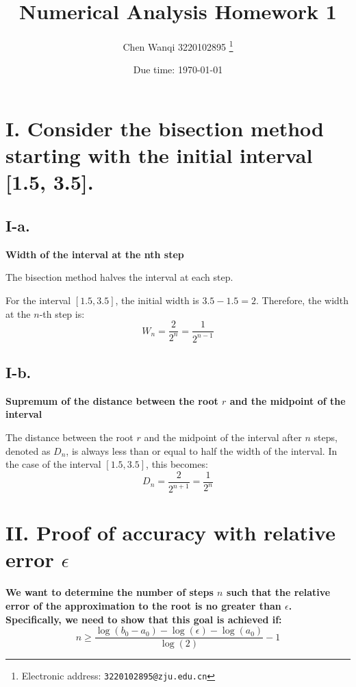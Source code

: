 \documentclass[a4paper]{article}
\begin{document}
\title{Numerical Analysis Homework 1}

\author{Chen Wanqi 3220102895
  \thanks{Electronic address: \texttt{3220102895@zju.edu.cn}}}

\date{Due time: \today}

\maketitle

\section*{I. Consider the bisection method starting with the initial interval [1.5, 3.5].}

\subsection*{I-a.}
\textbf{Width of the interval at the nth step}

The bisection method halves the interval at each step.

For the interval $[1.5, 3.5]$, the initial width is $3.5 - 1.5 = 2$. Therefore, the width at the $n$-th step is: 
\[
W_n = \frac{2}{2^n} = \frac{1}{2^{n-1}}
\]

\subsection*{I-b.}
\textbf{Supremum of the distance between the root $r$ and the midpoint of the interval}

The distance between the root $r$ and the midpoint of the interval after $n$ steps, denoted as $D_n$, is always less than or equal to half the width of the interval. In the case of the interval $[1.5, 3.5]$, this becomes:
\[
D_n = \frac{2}{2^{n+1}} = \frac{1}{2^n}
\]

\section*{II. Proof of accuracy with relative error $\epsilon$}

\textbf{We want to determine the number of steps $n$ such that the relative error of the approximation to the root is no greater than $\epsilon$. Specifically, we need to show that this goal is achieved if:}
\[
n \geq \frac{\log(b_0 - a_0) - \log(\epsilon) - \log(a_0)}{\log(2)} - 1
\]
\end{document}
